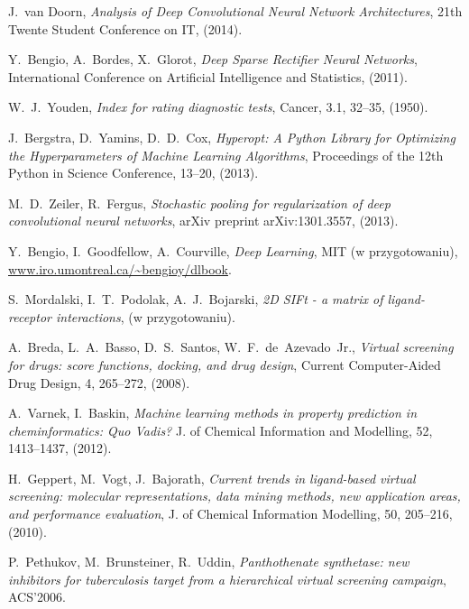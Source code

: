 \documentclass[a4paper,10pt]{report}
\begin{document}
  \begin{thebibliography}{99}
      J.~van Doorn,
      \emph{Analysis of Deep Convolutional Neural Network Architectures},
      21th Twente Student Conference on IT,
      (2014).
      
      Y.~Bengio, A.~Bordes, X.~Glorot,
      \emph{Deep Sparse Rectifier Neural Networks},
      International Conference on Artificial Intelligence and Statistics,
      (2011).
      
     W.~J.~Youden,
     \emph{Index for rating diagnostic tests},
     Cancer, 3.1, 32--35,
     (1950).
     
     J.~Bergstra, D.~Yamins, D.~D.~Cox,
     \emph{Hyperopt: A Python Library for Optimizing the Hyperparameters of Machine Learning Algorithms},
     Proceedings of the 12th Python in Science Conference, 13--20,
     (2013).
      
      M.~D.~Zeiler, R.~Fergus,
      \emph{Stochastic pooling for regularization of deep convolutional neural networks},
      arXiv preprint arXiv:1301.3557,
      (2013).
      
      Y.~Bengio, I.~Goodfellow, A.~Courville,
      \textit{Deep Learning},
      MIT (w przygotowaniu),
      \url{www.iro.umontreal.ca/~bengioy/dlbook}.

      S.~Mordalski, I.~T.~Podolak, A.~J.~Bojarski,
      \textit{2D SIFt - a matrix of ligand-receptor interactions},
      (w przygotowaniu).

      A.~Breda, L.~A.~Basso, D.~S.~Santos, W.~F.~de~Azevado~Jr., 
      \textit{Virtual screening for drugs: score functions, docking, and drug design},
      Current Computer-Aided Drug Design, 4, 265--272,
      (2008).

      A.~Varnek, I.~Baskin,
      \textit{Machine learning methods in property prediction in cheminformatics: Quo Vadis?}
      J. of Chemical Information and Modelling, 52, 1413--1437,
      (2012).

      H.~Geppert, M.~Vogt, J.~Bajorath,
      \textit{Current trends in ligand-based virtual screening: molecular representations, data mining methods, new application areas, and performance evaluation},
      J. of Chemical Information Modelling, 50, 205--216,
      (2010).

      P.~Pethukov, M.~Brunsteiner, R.~Uddin,
      \textit{Panthothenate synthetase: new inhibitors for tuberculosis target from a hierarchical virtual screening campaign},
      ACS'2006.


\end{thebibliography}
\end{document}
